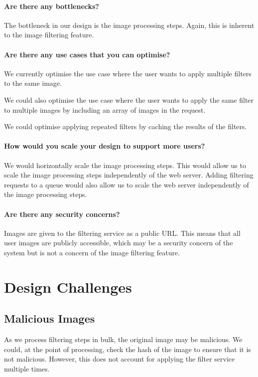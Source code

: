 \documentclass{csse4400}
\begin{document}
\paragraph{Are there any bottlenecks?}
The bottleneck in our design is the image processing steps.
Again, this is inherent to the image filtering feature.

\paragraph{Are there any use cases that you can optimise?}
We currently optimise the use case where the user wants to apply multiple filters to the same image.

We could also optimise the use case where the user wants to apply the same filter to multiple images by including an array of images in the request.

We could optimise applying repeated filters by caching the results of the filters.

\paragraph{How would you scale your design to support more users?}
We would horizontally scale the image processing steps.
This would allow us to scale the image processing steps independently of the web server.
Adding filtering requests to a queue would also allow us to scale the web server independently of the image processing steps.

\paragraph{Are there any security concerns?}
Images are given to the filtering service as a public URL.
This means that all user images are publicly accessible,
which may be a security concern of the system but is not a concern of the image filtering feature.

\section{Design Challenges}

\subsection{Malicious Images}
As we process filtering steps in bulk,
the original image may be malicious.
We could, at the point of processing,
check the hash of the image to ensure that it is not malicious.
However, this does not account for applying the filter service multiple times.
\end{document}
